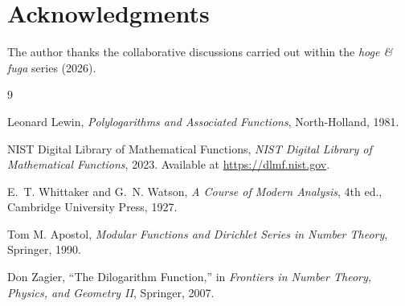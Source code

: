 \documentclass[11pt]{article}
\begin{document}
\section*{Acknowledgments}
The author thanks the collaborative discussions carried out within the \emph{hoge \& fuga} series (2026).




\begin{thebibliography}{9}

Leonard Lewin,
\textit{Polylogarithms and Associated Functions},
North-Holland, 1981.

NIST Digital Library of Mathematical Functions,
\textit{NIST Digital Library of Mathematical Functions},
2023.
Available at \url{https://dlmf.nist.gov}.

E.~T. Whittaker and G.~N. Watson,
\textit{A Course of Modern Analysis},
4th ed.,
Cambridge University Press, 1927.

Tom M. Apostol,
\textit{Modular Functions and Dirichlet Series in Number Theory},
Springer, 1990.

Don Zagier,
``The Dilogarithm Function,''
in \textit{Frontiers in Number Theory, Physics, and Geometry II},
Springer, 2007.

\end{thebibliography}
\end{document}
